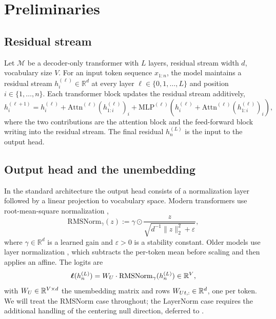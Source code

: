 \documentclass[11pt,letterpaper]{article}
\theoremstyle{plain}
\theoremstyle{definition}
\newcommand{\R}{\mathbb{R}}
\newcommand{\1}{\mathbf{1}}
\newcommand{\WU}{W_{U}\mathchoice{}{}{}{}}
\newcommand{\hres}{h}
\begin{document}
\section{Preliminaries}\label{sec:prelim}

\subsection{Residual stream}

Let $\mathcal{M}$ be a decoder-only transformer with $L$ layers, residual stream width $d$, vocabulary size $V$. For an input token sequence $x_{1:n}$, the model maintains a residual stream $\hres^{(\ell)}_i \in \R^d$ at every layer $\ell \in \{0, 1, \dots, L\}$ and position $i \in \{1, \dots, n\}$. Each transformer block updates the residual stream additively,
\begin{equation}
\hres^{(\ell+1)}_i = \hres^{(\ell)}_i + \mathrm{Attn}^{(\ell)}(\hres^{(\ell)}_{1:i})_i + \mathrm{MLP}^{(\ell)}(\hres^{(\ell)}_i + \mathrm{Attn}^{(\ell)}(\hres^{(\ell)}_{1:i})_i),
\label{eq:residual}
\end{equation}
where the two contributions are the attention block and the feed-forward block writing into the residual stream. The final residual $\hres^{(L)}_n$ is the input to the output head.

\subsection{Output head and the unembedding}

In the standard architecture the output head consists of a normalization layer followed by a linear projection to vocabulary space. Modern transformers use root-mean-square normalization \cite{zhang2019rmsnorm},
\begin{equation}
\mathrm{RMSNorm}_\gamma(z) := \gamma \odot \frac{z}{\sqrt{d^{-1}\|z\|_2^2 + \varepsilon}},
\label{eq:rmsnorm}
\end{equation}
where $\gamma \in \R^d$ is a learned gain and $\varepsilon > 0$ is a stability constant. Older models use layer normalization \cite{ba2016layernorm}, which subtracts the per-token mean before scaling and then applies an affine. The logits are
\begin{equation}
\bm{\ell}(\hres^{(L)}_n) = \WU \cdot \mathrm{RMSNorm}_\gamma(\hres^{(L)}_n) \in \R^V,
\label{eq:logits}
\end{equation}
with $\WU \in \R^{V \times d}$ the unembedding matrix and rows $\WU_{t,:} \in \R^d$, one per token. We will treat the RMSNorm case throughout; the LayerNorm case requires the additional handling of the centering null direction, deferred to .
\end{document}
